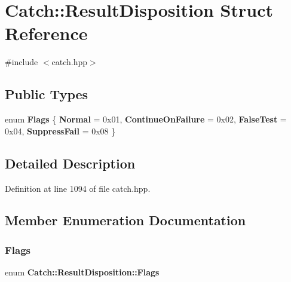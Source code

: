 \section{Catch\+::Result\+Disposition Struct Reference}
\label{struct_catch_1_1_result_disposition}


{\ttfamily \#include $<$catch.\+hpp$>$}

\subsection*{Public Types}
\begin{DoxyCompactItemize}
\item 
enum \textbf{ Flags} \{ \textbf{ Normal} = 0x01, 
\textbf{ Continue\+On\+Failure} = 0x02, 
\textbf{ False\+Test} = 0x04, 
\textbf{ Suppress\+Fail} = 0x08
 \}
\end{DoxyCompactItemize}


\subsection{Detailed Description}


Definition at line 1094 of file catch.\+hpp.



\subsection{Member Enumeration Documentation}
\mbox{\label{struct_catch_1_1_result_disposition_a3396cad6e2259af326b3aae93e23e9d8}} 
\subsubsection{Flags}
{\footnotesize\ttfamily enum \textbf{ Catch\+::\+Result\+Disposition\+::\+Flags}}

